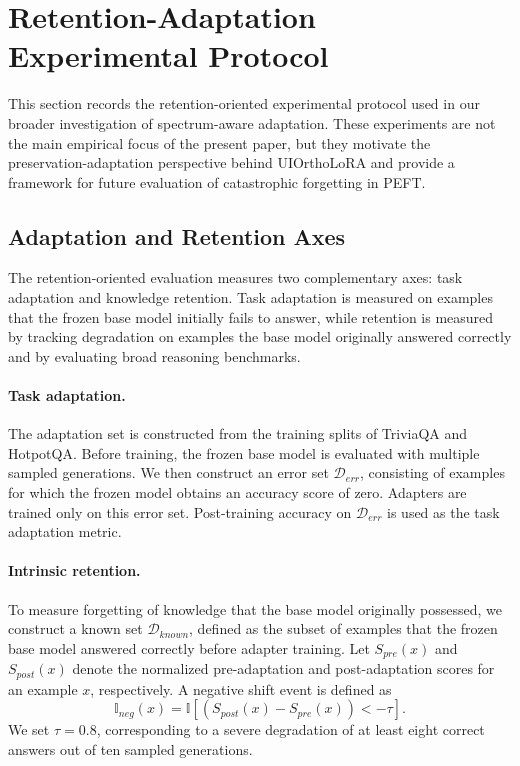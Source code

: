 \section{Retention-Adaptation Experimental Protocol}
\label{app:retention_adaptation_protocol}

This section records the retention-oriented experimental protocol used in our
broader investigation of spectrum-aware adaptation. These experiments are not
the main empirical focus of the present paper, but they motivate the
preservation-adaptation perspective behind UIOrthoLoRA and provide a framework
for future evaluation of catastrophic forgetting in PEFT.

\subsection{Adaptation and Retention Axes}
\label{app:adaptation_retention_axes}

The retention-oriented evaluation measures two complementary axes: task
adaptation and knowledge retention. Task adaptation is measured on examples
that the frozen base model initially fails to answer, while retention is
measured by tracking degradation on examples the base model originally answered
correctly and by evaluating broad reasoning benchmarks.

\paragraph{Task adaptation.}
The adaptation set is constructed from the training splits of TriviaQA and
HotpotQA. Before training, the frozen base model is evaluated with multiple
sampled generations. We then construct an error set
\(\mathcal{D}_{err}\), consisting of examples for which the frozen model obtains
an accuracy score of zero. Adapters are trained only on this error set.
Post-training accuracy on \(\mathcal{D}_{err}\) is used as the task adaptation
metric.

\paragraph{Intrinsic retention.}
To measure forgetting of knowledge that the base model originally possessed,
we construct a known set \(\mathcal{D}_{known}\), defined as the subset of
examples that the frozen base model answered correctly before adapter training.
Let \(S_{pre}(x)\) and \(S_{post}(x)\) denote the normalized pre-adaptation and
post-adaptation scores for an example \(x\), respectively. A negative shift
event is defined as
\[
\mathbb{I}_{neg}(x)
=
\mathbb{I}
\left[
(S_{post}(x)-S_{pre}(x)) < -\tau
\right].
\]
We set \(\tau = 0.8\), corresponding to a severe degradation of at least eight
correct answers out of ten sampled generations.

